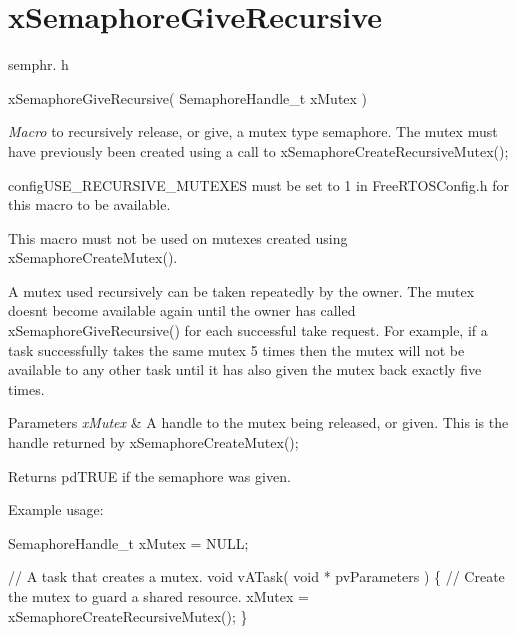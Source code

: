 \hypertarget{group__xSemaphoreGiveRecursive}{}\section{x\+Semaphore\+Give\+Recursive}
\label{group__xSemaphoreGiveRecursive}
semphr. h 
\begin{DoxyPre}xSemaphoreGiveRecursive( SemaphoreHandle\_t xMutex )\end{DoxyPre}


{\itshape Macro} to recursively release, or \textquotesingle{}give\textquotesingle{}, a mutex type semaphore. The mutex must have previously been created using a call to x\+Semaphore\+Create\+Recursive\+Mutex();

config\+U\+S\+E\+\_\+\+R\+E\+C\+U\+R\+S\+I\+V\+E\+\_\+\+M\+U\+T\+E\+X\+ES must be set to 1 in Free\+R\+T\+O\+S\+Config.\+h for this macro to be available.

This macro must not be used on mutexes created using x\+Semaphore\+Create\+Mutex().

A mutex used recursively can be \textquotesingle{}taken\textquotesingle{} repeatedly by the owner. The mutex doesn\textquotesingle{}t become available again until the owner has called x\+Semaphore\+Give\+Recursive() for each successful \textquotesingle{}take\textquotesingle{} request. For example, if a task successfully \textquotesingle{}takes\textquotesingle{} the same mutex 5 times then the mutex will not be available to any other task until it has also \textquotesingle{}given\textquotesingle{} the mutex back exactly five times.


\begin{DoxyParams}{Parameters}
{\em x\+Mutex} & A handle to the mutex being released, or \textquotesingle{}given\textquotesingle{}. This is the handle returned by x\+Semaphore\+Create\+Mutex();\\
\hline
\end{DoxyParams}
\begin{DoxyReturn}{Returns}
pd\+T\+R\+UE if the semaphore was given.
\end{DoxyReturn}
Example usage\+: 
\begin{DoxyPre}
SemaphoreHandle\_t xMutex = NULL;\end{DoxyPre}



\begin{DoxyPre}// A task that creates a mutex.
void vATask( void * pvParameters )
\{
   // Create the mutex to guard a shared resource.
   xMutex = xSemaphoreCreateRecursiveMutex();
\}\end{DoxyPre}



